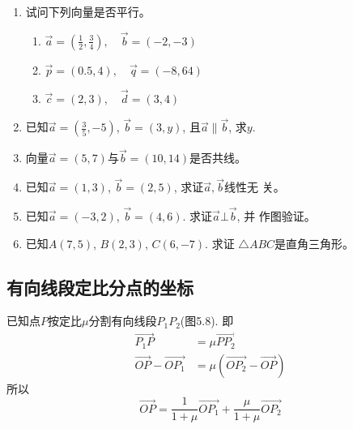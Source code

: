 \begin{ex}
\begin{enumerate}
    \item 试问下列向量是否平行。
    \begin{enumerate}
    \item $\vec{a}=\left(\frac{1}{2},\frac{3}{4}\right),\quad \vec{b}=(-2,-3)$
    \item $\vec{p}=(0.5,4),\quad \vec{q}=(-8,64)$
    \item $\vec{c}=(2,3),\quad \vec{d}=(3,4)$
\end{enumerate}

\item 已知$\vec{a}=\left(\frac{3}{5},-5\right)$, $\vec{b}=(3,y)$, 且$\vec{a}\parallel \vec{b}$, 求$y$.

\item 向量$\vec{a}=(5,7)$与$\vec{b}=(10,14)$是否共线。

\item 已知$\vec{a}=(1,3)$, $\vec{b}=(2,5)$, 求证$\vec{a},\vec{b}$线性无
关。

\item 已知$\vec{a}=(-3,2)$, $\vec{b}=(4,6)$. 求证$\vec{a}\bot \vec{b}$, 并
作图验证。

\item 已知$A(7,5)$, $B(2,3)$, $C(6,-7)$. 求证
$\triangle ABC$是直角三角形。
\end{enumerate}
\end{ex}

\subsection{有向线段定比分点的坐标}
已知点$P$按定比$\mu$分割有向线段$P_1P_2$(图5.8). 
即
\[\begin{split}
     \Vec{P_1P}&=\mu \Vec{PP_2}\\
     \Vec{OP}-\Vec{OP_1}&=\mu\left(\Vec{OP_2}-\Vec{OP}\right)
\end{split}\]
所以
\[\Vec{OP}=\frac{1}{1+\mu}\Vec{OP_1}+\frac{\mu}{1+\mu}\Vec{OP_2}\]

\begin{figure}[htp]
    \centering
{}
    \caption{}
\end{figure}


